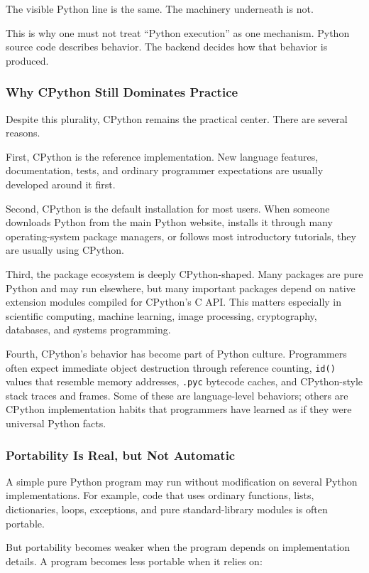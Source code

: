 The visible Python line is the same. The machinery underneath is not.

This is why one must not treat ``Python execution'' as one mechanism. Python source code describes behavior. The backend decides how that behavior is produced.

\subsubsection{Why CPython Still Dominates Practice}

Despite this plurality, CPython remains the practical center. There are several reasons.

First, CPython is the reference implementation. New language features, documentation, tests, and ordinary programmer expectations are usually developed around it first.

Second, CPython is the default installation for most users. When someone downloads Python from the main Python website, installs it through many operating-system package managers, or follows most introductory tutorials, they are usually using CPython.

Third, the package ecosystem is deeply CPython-shaped. Many packages are pure Python and may run elsewhere, but many important packages depend on native extension modules compiled for CPython's C API. This matters especially in scientific computing, machine learning, image processing, cryptography, databases, and systems programming.

Fourth, CPython's behavior has become part of Python culture. Programmers often expect immediate object destruction through reference counting, \texttt{id()} values that resemble memory addresses, \texttt{.pyc} bytecode caches, and CPython-style stack traces and frames. Some of these are language-level behaviors; others are CPython implementation habits that programmers have learned as if they were universal Python facts.

\subsubsection{Portability Is Real, but Not Automatic}

A simple pure Python program may run without modification on several Python implementations. For example, code that uses ordinary functions, lists, dictionaries, loops, exceptions, and pure standard-library modules is often portable.

But portability becomes weaker when the program depends on implementation details. A program becomes less portable when it relies on:


